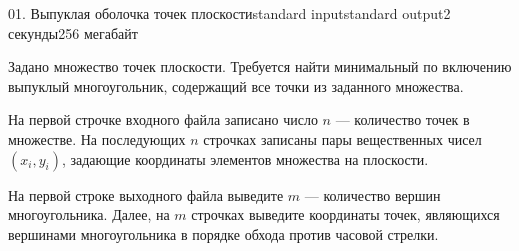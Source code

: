 \begin{problem}{01. Выпуклая оболочка точек плоскости}{standard input}{standard output}{2 секунды}{256 мегабайт}

Задано множество точек плоскости. Требуется найти минимальный по включению выпуклый многоугольник, содержащий все точки из заданного множества.

\InputFile

На первой строчке входного файла записано число $n$ — количество точек в множестве. На последующих $n$ строчках записаны пары вещественных чисел $(x_i, y_i)$, задающие координаты элементов множества на плоскости.

\OutputFile

На первой строке выходного файла выведите $m$ — количество вершин многоугольника. Далее, на $m$ строчках выведите координаты точек, являющихся вершинами многоугольника в порядке обхода против часовой стрелки. 

\Examples

\begin{example}%
%
\end{example}

\end{problem}
